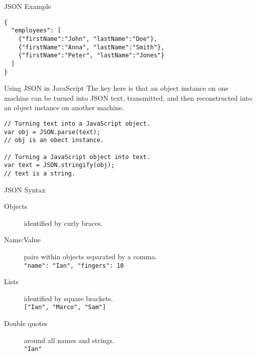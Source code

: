 \documentclass{beamer}
\begin{document}
\begin{frame}[fragile]{JSON Example}
  \begin{verbatim}
{
  "employees": [
    {"firstName":"John", "lastName":"Doe"},
    {"firstName":"Anna", "lastName":"Smith"},
    {"firstName":"Peter", "lastName":"Jones"}
  ]
}
  \end{verbatim}
\end{frame}


\begin{frame}[fragile]{Using JSON in JavaScript}
  The key here is that an object instance on one machine can be turned into JSON text, transmitted, and then reconstructed into an object instance on another machine. 
  \begin{verbatim}
// Turning text into a JavaScript object.
var obj = JSON.parse(text);
// obj is an obect instance.

// Turning a JavaScript object into text.
var text = JSON.stringify(obj);
// text is a string.
  \end{verbatim}
\end{frame}

\begin{frame}{JSON Syntax}
  \begin{description}
    \item[Objects] identified by curly braces. \\
    \hspace{0.5cm} \texttt{{}}
    \item[Name:Value] pairs within objects separated by a comma. \\
    \hspace{0.5cm} \texttt{{"name": "Ian", "fingers": 10}}
    \item[Lists] identified by square brackets. \\
    \hspace{0.5cm} \texttt{["Ian", "Marco", "Sam"]}
    \item[Double quotes] around all names and strings. \\
    \hspace{0.5cm} \texttt{"Ian"}
  \end{description}
\end{frame}
\end{document}
